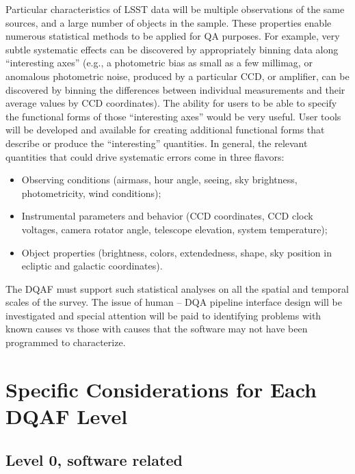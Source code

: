 \documentclass[SE,toc,lsstdraft]{lsstdoc}
\begin{document}
Particular characteristics of LSST data will be multiple observations of the same sources, and a large
number of objects in the sample. These properties enable numerous statistical methods to be applied
for QA purposes. For example, very subtle systematic effects can be discovered by appropriately binning
data along ``interesting axes''  (e.g., a photometric bias as small as a few millimag, or anomalous
photometric noise, produced by a particular CCD, or amplifier, can be discovered by binning the differences
between individual measurements and their average values by CCD coordinates).  The ability for users to be able to specify the functional forms of those ``interesting axes'' would be very useful.   User tools will be developed and available for creating additional functional forms that describe or produce the ``interesting'' quantities.  In general, the relevant
quantities that could drive systematic errors come in three flavors:
\begin{itemize}
\item Observing conditions (airmass, hour angle, seeing, sky brightness, photometricity, wind conditions);
\item Instrumental parameters and behavior (CCD coordinates, CCD clock voltages, camera rotator angle, telescope elevation, system
         temperature);
\item Object properties (brightness, colors, extendedness, shape, sky position in ecliptic and galactic coordinates).
\end{itemize}


The DQAF must support such statistical analyses on all the spatial and temporal scales of the survey. The issue of human – DQA pipeline interface design will be investigated and special attention will be paid to identifying problems with known causes vs those with causes that the software may not have been programmed to characterize.




\section{Specific Considerations for Each DQAF Level}


\subsection{Level 0, software related}
\end{document}
